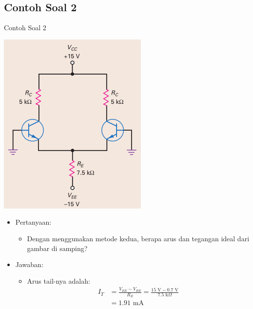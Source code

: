 \documentclass[aspectratio=169]{beamer}
\begin{document}
\subsection{Contoh Soal 2}
\begin{frame}{Contoh Soal 2}
	\begin{multicols}{2}
		\begin{center}
			\includegraphics[width=0.6\textheight]{gambar/01.diff-amp/01.latihan_soal_1a}
		\end{center}
		\columnbreak
		\begin{itemize}
			\item Pertanyaan:
			\begin{itemize}
				\item Dengan menggunakan metode kedua, berapa arus dan tegangan ideal dari gambar di samping?
			\end{itemize}
			\item Jawaban:
			\begin{itemize}
				\item Arus tail-nya adalah:
				\begin{align*}
					I_T &= \frac{V_{EE}-V_{BE}}{R_E} = \frac{15 \text{ V} - 0.7 \text{ V}}{7.5 \text{ k}\Omega} \\
					&= 1.91 \text{ mA}
				\end{align*}
			\end{itemize}
		\end{itemize}
		\vfill\null
	\end{multicols}
\end{frame}
\end{document}
